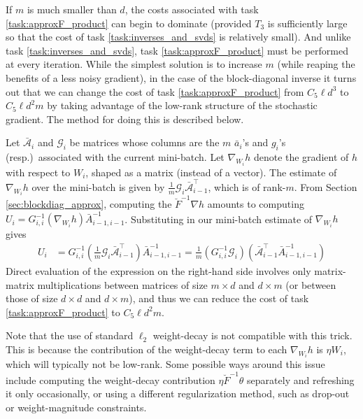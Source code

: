 \documentclass[12pt]{article}
\begin{document}
If $m$ is much smaller than $d$, the costs associated with task \ref{task:approxF_product} can begin to dominate (provided $T_3$ is sufficiently large so that the cost of task \ref{task:inverses_and_svds} is relatively small).  And unlike task \ref{task:inverses_and_svds}, task \ref{task:approxF_product} must be performed at every iteration.  While the simplest solution is to increase $m$ (while reaping the benefits of a less noisy gradient), in the case of the block-diagonal inverse it turns out that we can change the cost of task \ref{task:approxF_product} from $C_5 \ell d^3$ to $C_5 \ell d^2 m$ by taking advantage of the low-rank structure of the stochastic gradient.  The method for doing this is described below.

Let $\bar{\mathcal{A}}_i$ and $\mathcal{G}_i$ be matrices whose columns are the $m$ $\bar{a}_i$'s and $g_i$'s (resp.)~associated with the current mini-batch.  Let $\nabla_{W_i} h$ denote the gradient of $h$ with respect to $W_i$, shaped as a matrix (instead of a vector).  The estimate of $\nabla_{W_i} h$ over the mini-batch is given by $\frac{1}{m} \mathcal{G}_i \bar{\mathcal{A}}_{i-1}^\top$, which is of rank-$m$.  From Section \ref{sec:blockdiag_approx}, computing the $\breve{F}^{-1} \nabla h$ amounts to computing $U_i = G_{i,i}^{-1} (\nabla_{W_i} h) \bar{A}_{i-1,i-1}^{-1}$.  Substituting in our mini-batch estimate of $\nabla_{W_i} h$ gives
\begin{align*}
U_i &= G_{i,i}^{-1} \left( \frac{1}{m} \mathcal{G}_i \bar{\mathcal{A}}_{i-1}^\top \right) \bar{A}_{i-1,i-1}^{-1} = \frac{1}{m} \left( G_{i,i}^{-1} \mathcal{G}_i \right) \left( \bar{\mathcal{A}}_{i-1}^\top \bar{A}_{i-1,i-1}^{-1} \right)
\end{align*}
Direct evaluation of the expression on the right-hand side involves only matrix-matrix multiplications between matrices of size $m \times d$ and $d \times m$ (or between those of size $d \times d$ and $d \times m$), and thus we can reduce the cost of task \ref{task:approxF_product} to $C_5 \ell d^2 m$.

Note that the use of standard $\ell_2$ weight-decay is not compatible with this trick.  This is because the contribution of the weight-decay term to each $\nabla_{W_i} h$ is $\eta W_i$, which will typically not be low-rank.  Some possible ways around this issue include computing the weight-decay contribution $\eta \breve{F}^{-1} \theta$ separately and refreshing it only occasionally, or using a different regularization method, such as drop-out \citep{dropout} or weight-magnitude constraints.
\end{document}
